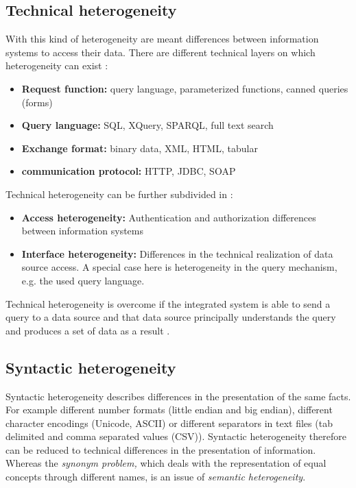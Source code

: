 \subsection{Technical  heterogeneity}
With this kind of heterogeneity are meant differences between information systems to access their data. There are different technical layers on which heterogeneity can exist \cite[p. 62]{DBLP:books/dp/LeserN2006}:
\begin{itemize}
\item \textbf{Request function:} query language, parameterized  functions, canned queries (forms)
\item \textbf{Query language:} SQL, XQuery, SPARQL, full text search
\item \textbf{Exchange format:} binary data, XML, HTML, tabular
\item \textbf{communication protocol:} HTTP, JDBC, SOAP
\end{itemize}

Technical heterogeneity can be further subdivided in \cite[p. 64]{DBLP:books/dp/LeserN2006}: \label{technical_heterogeneity_subtypes}
\begin{itemize}
\item \textbf{Access heterogeneity:} Authentication and authorization differences between information systems
\item \textbf{Interface heterogeneity:} Differences in the technical realization of data source access. A special case here is heterogeneity in the query mechanism, e.g. the used query language.
\end{itemize}

Technical  heterogeneity is overcome if the integrated system is able to send a query to a data source and that data source principally understands the query and produces a set of data as a result \cite[p. 61]{DBLP:books/dp/LeserN2006}.

\subsection{Syntactic  heterogeneity}
Syntactic heterogeneity describes differences in the presentation of the same facts\cite[p. 64]{DBLP:books/dp/LeserN2006}. For example different number formats (little endian and big endian), different character encodings (Unicode, ASCII) or different separators in text files (tab delimited and comma separated values (CSV)). Syntactic heterogeneity therefore can be reduced to technical differences in the presentation of information. Whereas the \textit{synonym problem,} which deals with the representation of equal concepts through different names, is an issue of \textit{semantic heterogeneity}.

